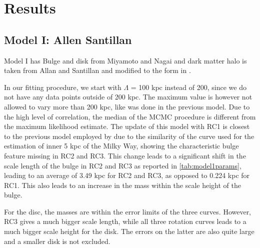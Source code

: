 \documentclass[fleqn,usenatbib]{mnras}
\begin{document}
\section{Results}

\subsection{Model I: Allen Santillan}

Model I has Bulge and disk from Miyamoto and Nagai and dark matter halo is taken from Allan and Santillan and modified to the form in \citet{andreassmass}.

 In our fitting procedure, we start with $\Lambda$ = 100 kpc instead of 200, since we do not have any data points outside of 200 kpc. The maximum value is however not allowed to vary more than 200 kpc, like was done in the previous model. Due to the high level of correlation, the median of the MCMC procedure is different from the maximum likelihood estimate. The update of this model with RC1 is closest to the previous model employed by \citet{andreassmass} due to the similarity of the curve used for the estimation of inner 5 kpc of the Milky Way, showing the characteristic bulge feature missing in RC2 and RC3. This change leads to a significant shift in the scale length of the bulge in RC2 and RC3 as reported in \ref{tab:model1params}, leading to an average of 3.49 kpc for RC2 and RC3, as opposed to 0.224 kpc for RC1. This also leads to an increase in the mass within the scale height of the bulge.
 
 For the disc, the masses are within the error limits of the three curves. However, RC3 gives a much bigger scale length, while all three rotation curves leads to a much bigger scale height for the disk. The errors on the latter are also quite large and a smaller disk is not excluded.
 
\end{document}
